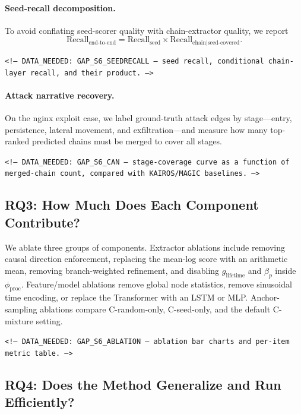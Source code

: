 \paragraph{Seed-recall decomposition.} To avoid conflating seed-scorer quality with chain-extractor quality, we report
\[
\mathrm{Recall}_{\text{end-to-end}} = \mathrm{Recall}_{\text{seed}} \times \mathrm{Recall}_{\text{chain}\mid\text{seed-covered}}.
\]
\begin{flushleft}\small\texttt{<!-- DATA\_NEEDED: GAP\_S6\_SEEDRECALL --- seed recall, conditional chain-layer recall, and their product. -->}\end{flushleft}

\paragraph{Attack narrative recovery.} On the nginx exploit case, we label ground-truth attack edges by stage---entry, persistence, lateral movement, and exfiltration---and measure how many top-ranked predicted chains must be merged to cover all stages.
\begin{flushleft}\small\texttt{<!-- DATA\_NEEDED: GAP\_S6\_CAN --- stage-coverage curve as a function of merged-chain count, compared with KAIROS/MAGIC baselines. -->}\end{flushleft}

\subsection{RQ3: How Much Does Each Component Contribute?}

We ablate three groups of components. Extractor ablations include removing causal direction enforcement, replacing the mean-log score with an arithmetic mean, removing branch-weighted refinement, and disabling $g_{\text{lifetime}}$ and $\beta_p$ inside $\phi_{\text{proc}}$. Feature/model ablations remove global node statistics, remove sinusoidal time encoding, or replace the Transformer with an LSTM or MLP. Anchor-sampling ablations compare C-random-only, C-seed-only, and the default C-mixture setting.
\begin{flushleft}\small\texttt{<!-- DATA\_NEEDED: GAP\_S6\_ABLATION --- ablation bar charts and per-item metric table. -->}\end{flushleft}

\subsection{RQ4: Does the Method Generalize and Run Efficiently?}

